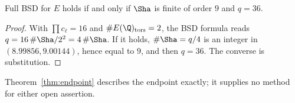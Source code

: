 \begin{theorem}\label{thm:endpoint}
Full BSD for $E$ holds if and only if $\Sha$ is finite of order $9$ and $q=36$.
\end{theorem}
\begin{proof}
With $\prod c_\ell=16$ and $\#E(\Q)_{\mathrm{tors}}=2$, the BSD formula reads $q=16\,\#\Sha/2^2=4\,\#\Sha$. If it holds, $\#\Sha=q/4$ is an integer in $(8.99856,9.00144)$, hence equal to $9$, and then $q=36$. The converse is substitution.
\end{proof}
Theorem~\ref{thm:endpoint} describes the endpoint exactly; it supplies no method for either open assertion.
